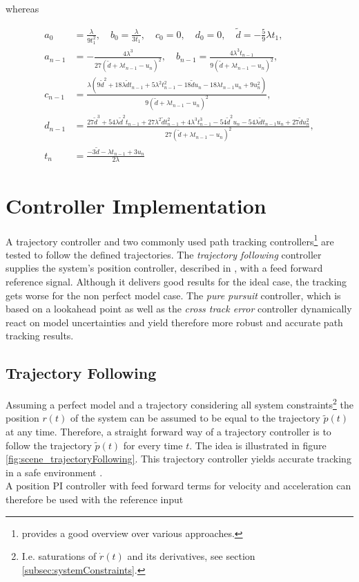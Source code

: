 whereas

\begin{align*}
a_0 &= \frac{\lambda}{9t_1^2} , \quad
b_0 = \frac{\lambda}{3t_1} , \quad
c_0 = 0 , \quad
d_0 = 0 , \quad
\tilde{d} = - \frac{5}{9}\lambda t_1 , \\
a_{n-1} &= -\frac{4 \lambda^3}{27 (\tilde{d} + \lambda t_{n-1} - u_n)^2} , \quad
b_{n-1} = \frac{4 \lambda^3 t_{n-1}}{9 (\tilde{d} + \lambda t_{n-1} - u_n)^2} , \\
c_{n-1} &= \frac{\lambda (9 \tilde{d}^2 + 18 \lambda \tilde{d} t_{n-1} + 5 \lambda^2 t_{n-1}^2 - 18 \tilde{d} u_n - 18 \lambda t_{n-1} u_n + 
   9 u_n^2)}{9 (\tilde{d} + \lambda t_{n-1} - u_n)^2} , \\
d_{n-1} &= \frac{27 \tilde{d}^3 + 54 \lambda \tilde{d}^2 t_{n-1} + 27 \lambda^2 \tilde{d} t_{n-1}^2 + 4 \lambda^3 t_{n-1}^3 - 
 54 \tilde{d}^2 u_n - 54 \lambda \tilde{d} t_{n-1} u_n + 27 \tilde{d} u_n^2}{27 (\tilde{d} + \lambda t_{n-1} - u_n)^2} , \\
t_n &= \frac{-3 \tilde{d} - \lambda t_{n-1} + 3 u_n}{2 \lambda}
\end{align*}

\section{Controller Implementation}
\label{sec:controllerImplementation}
A trajectory controller and two commonly used path tracking controllers\footnote{\cite{snider} provides a good overview over various approaches.} are tested to follow the defined trajectories. The \textit{trajectory following} controller supplies the system's position controller, described in \cite{meiermueri}, with a feed forward reference signal. Although it delivers good results for the ideal case, the tracking gets worse for the non perfect model case. The \textit{pure pursuit} controller, which is based on a lookahead point as well as the \textit{cross track error} controller dynamically react on model uncertainties and yield therefore more robust and accurate path tracking results.

\subsection{Trajectory Following}
Assuming a perfect model and a trajectory considering all system constraints\footnote{I.e. saturations of $\dot{r}(t)$ and its derivatives, see section \ref{subsec:systemConstraints}.} the position $r\left(t\right)$ of the system can be assumed to be equal to the trajectory $\tilde{p}(t)$ at any time. Therefore, a straight forward way of a trajectory controller is to follow the trajectory $\tilde{p}(t)$ for every time $t$. The idea is illustrated in figure \ref{fig:scene_trajectoryFollowing}. This trajectory controller yields accurate tracking in a safe environment \cite{doessegger}.
\\
A position PI controller with feed forward terms for velocity and acceleration can therefore be used with the reference input

